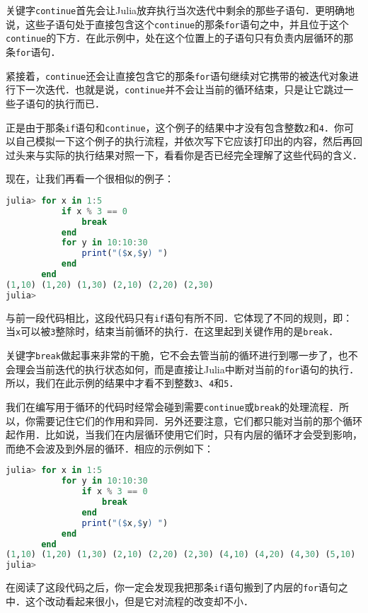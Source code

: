 关键字\verb|continue|首先会让Julia放弃执行当次迭代中剩余的那些子语句．更明确地说，这些子语句处于直接包含这个\verb|continue|的那条\verb|for|语句之中，并且位于这个\verb|continue|的下方．在此示例中，处在这个位置上的子语句只有负责内层循环的那条\verb|for|语句．

紧接着，\verb|continue|还会让直接包含它的那条\verb|for|语句继续对它携带的被迭代对象进行下一次迭代．也就是说，\verb|continue|并不会让当前的循环结束，只是让它跳过一些子语句的执行而已．

正是由于那条\verb|if|语句和\verb|continue|，这个例子的结果中才没有包含整数\verb|2|和\verb|4|．你可以自己模拟一下这个例子的执行流程，并依次写下它应该打印出的内容，然后再回过头来与实际的执行结果对照一下，看看你是否已经完全理解了这些代码的含义．

现在，让我们再看一个很相似的例子：
\begin{lstlisting}[language=julia]
julia> for x in 1:5
           if x % 3 == 0
               break
           end
           for y in 10:10:30
               print("($x,$y) ")
           end
       end
(1,10) (1,20) (1,30) (2,10) (2,20) (2,30) 
julia> 
\end{lstlisting}

与前一段代码相比，这段代码只有\verb|if|语句有所不同．它体现了不同的规则，即：当\verb|x|可以被\verb|3|整除时，结束当前循环的执行．在这里起到关键作用的是\verb|break|．

关键字\verb|break|做起事来非常的干脆，它不会去管当前的循环进行到哪一步了，也不会理会当前迭代的执行状态如何，而是直接让Julia中断对当前的\verb|for|语句的执行．所以，我们在此示例的结果中才看不到整数\verb|3|、\verb|4|和\verb|5|．

我们在编写用于循环的代码时经常会碰到需要\verb|continue|或\verb|break|的处理流程．所以，你需要记住它们的作用和异同．另外还要注意，它们都只能对当前的那个循环起作用．比如说，当我们在内层循环使用它们时，只有内层的循环才会受到影响，而绝不会波及到外层的循环．相应的示例如下：
\begin{lstlisting}[language=julia]
julia> for x in 1:5
           for y in 10:10:30
               if x % 3 == 0 
                   break
               end
               print("($x,$y) ")
           end
       end
(1,10) (1,20) (1,30) (2,10) (2,20) (2,30) (4,10) (4,20) (4,30) (5,10) (5,20) (5,30) 
julia> 
\end{lstlisting}

在阅读了这段代码之后，你一定会发现我把那条\verb|if|语句搬到了内层的\verb|for|语句之中．这个改动看起来很小，但是它对流程的改变却不小．

